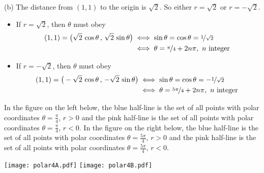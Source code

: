 \begin{solution}
(b)
The distance from $(1,1)$ to the origin is $\sqrt{2}$. 
So either $r=\sqrt{2}$ or $r=-\sqrt{2}$.
\begin{itemize}
\item If $r=\sqrt{2}$, then $\theta$ must obey 
\begin{align*}
(1,1) = \big(\sqrt{2}\,\cos\theta\,,\,\sqrt{2}\,\sin\theta\big)
&\iff \sin\theta=\cos\theta=\nicefrac{1}{\sqrt{2}} \\
&\iff \theta= \nicefrac{\pi}{4} + 2n\pi,\ n\text{ integer }
\end{align*}
\item If $r=-\sqrt{2}$, then $\theta$ must obey 
\begin{align*}
(1,1) = \big(-\sqrt{2}\,\cos\theta\,,\,-\sqrt{2}\,\sin\theta\big)
&\iff \sin\theta=\cos\theta=-\nicefrac{1}{\sqrt{2}} \\
&\iff \theta= \nicefrac{5\pi}{4} + 2n\pi,\ n\text{ integer }
\end{align*}
\end{itemize}
In the figure on the left below, the blue half-line is the set of all points 
with polar coordinates $\theta=\frac{\pi}{4}$, $r>0$ and the pink half-line 
is the set of all points  with polar coordinates $\theta=\frac{\pi}{4}$, $r<0$. 
In the figure on the right below, the blue half-line is the set of all points 
with polar coordinates $\theta=\frac{5\pi}{4}$, $r>0$ and the pink 
half-line is the set of all points  with polar coordinates 
$\theta=\frac{5\pi}{4}$, $r<0$. 
\begin{center}
  \texttt{[image: polar4A.pdf]}\qquad
  \texttt{[image: polar4B.pdf]}
\end{center}


\end{solution}
